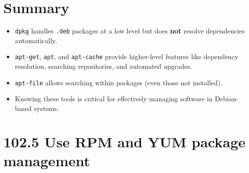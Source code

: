 \documentclass[12pt,a4paper]{report}
\begin{document}
 

\section*{Summary}

\begin{itemize}
    \item \texttt{dpkg} handles \texttt{.deb} packages at a low level but does \textbf{not} resolve dependencies automatically.  
    \item \texttt{apt-get}, \texttt{apt}, and \texttt{apt-cache} provide higher-level features like dependency resolution, searching repositories, and automated upgrades.  
    \item \texttt{apt-file} allows searching within packages (even those not installed).  
    \item Knowing these tools is critical for effectively managing software in Debian-based systems.
\end{itemize}







\section*{102.5 Use RPM and YUM package management}





\end{document}
